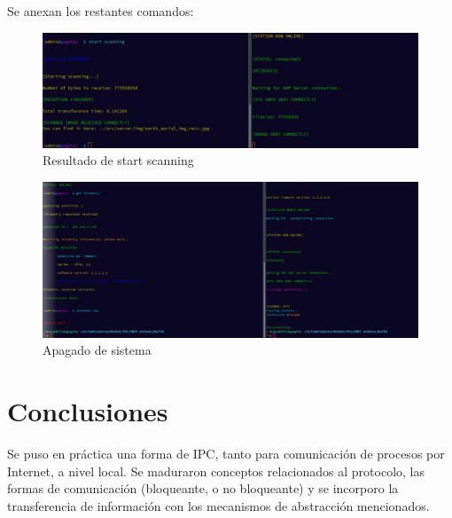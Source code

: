 \documentclass[fontsize=12pt]{article}
\begin{document}
Se anexan los restantes comandos:\\

\begin{figure}[H]
\centering
\includegraphics[scale =0.60]{start_scanning.jpg}
\caption{Resultado de start scanning}
\end{figure}



\begin{figure}[H]
\centering
\includegraphics[scale =0.45]{shutdown_now.jpg}
\caption{Apagado de sistema}
\end{figure}



\section{\textbf{Conclusiones}}\label{concl}
Se puso en práctica una forma de IPC, tanto para comunicación de procesos por Internet, a nivel local.
Se maduraron conceptos relacionados al protocolo, las formas de comunicación (bloqueante, o no bloqueante)
y se incorporo la transferencia de información con los mecanismos de abstracción mencionados.\\
\clearpage

\nocite{*}

\end{document}
